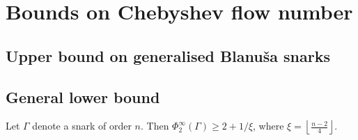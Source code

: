 \chapter{Bounds on Chebyshev flow number} %


\section{Upper bound on generalised Blanuša snarks}

\section{General lower bound}

\begin{proposition}
	Let $\Gamma$ denote a snark of order $n$. Then $\Phi_2^{\infty}(\Gamma) \geq 2+1 / \xi$, where $\xi=\left\lfloor\frac{n-2}{4}\right\rfloor$.
\end{proposition}

